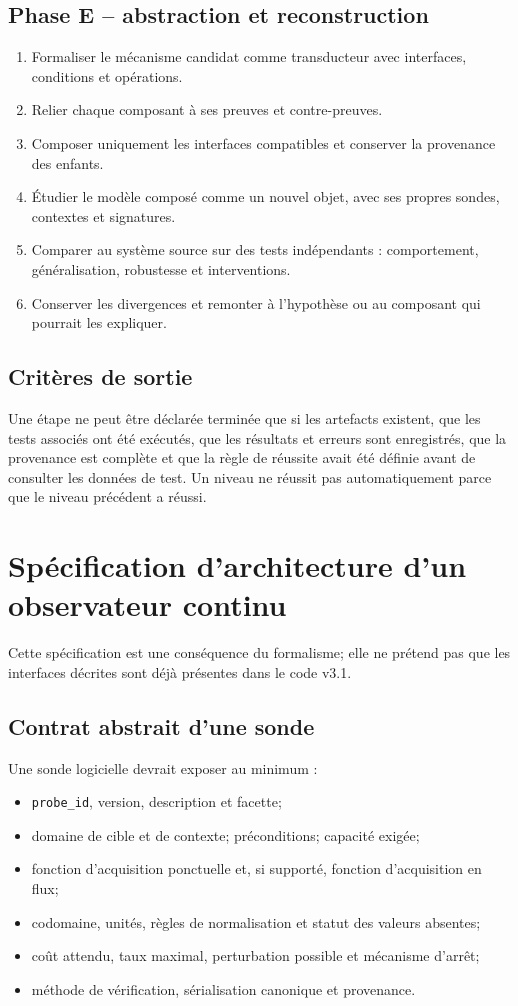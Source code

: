\documentclass[11pt,oneside]{book}
\theoremstyle{definition}
\theoremstyle{remark}
\newcommand{\1}{\mathbf 1}
\begin{document}
\section{Phase E -- abstraction et reconstruction}
\begin{enumerate}
\item Formaliser le mécanisme candidat comme transducteur avec interfaces, conditions et opérations.
\item Relier chaque composant à ses preuves et contre-preuves.
\item Composer uniquement les interfaces compatibles et conserver la provenance des enfants.
\item Étudier le modèle composé comme un nouvel objet, avec ses propres sondes, contextes et signatures.
\item Comparer au système source sur des tests indépendants : comportement, généralisation, robustesse et interventions.
\item Conserver les divergences et remonter à l'hypothèse ou au composant qui pourrait les expliquer.
\end{enumerate}

\section{Critères de sortie}
Une étape ne peut être déclarée terminée que si les artefacts existent, que les tests associés ont été exécutés, que les résultats et erreurs sont enregistrés, que la provenance est complète et que la règle de réussite avait été définie avant de consulter les données de test. Un niveau ne réussit pas automatiquement parce que le niveau précédent a réussi.

\chapter{Spécification d'architecture d'un observateur continu}
Cette spécification est une conséquence du formalisme; elle ne prétend pas que les interfaces décrites sont déjà présentes dans le code v3.1.

\section{Contrat abstrait d'une sonde}
Une sonde logicielle devrait exposer au minimum :
\begin{itemize}
\item \texttt{probe\_id}, version, description et facette;
\item domaine de cible et de contexte; préconditions; capacité exigée;
\item fonction d'acquisition ponctuelle et, si supporté, fonction d'acquisition en flux;
\item codomaine, unités, règles de normalisation et statut des valeurs absentes;
\item coût attendu, taux maximal, perturbation possible et mécanisme d'arrêt;
\item méthode de vérification, sérialisation canonique et provenance.
\end{itemize}
\end{document}
